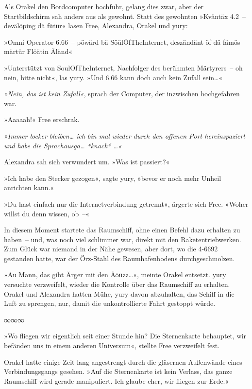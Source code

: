 Als Orakel den Bordcomputer hochfuhr, gelang dies zwar, aber der Startbildschirm sah anders aus als gewohnt. Statt des gewohnten »Kväntäx 4.2~– devälöping dä fütür« lasen Free, Alexandra, Orakel und yury:

»Omni Operator 6.66~– pöwärd bä SöülÖfTheInternet, deszändänt öf dä fämös märtür Flöätin Äländ«

»Unterstützt von SoulOfTheInternet, Nachfolger des berühmten Märtyrers~– oh nein, bitte nicht«, las yury. »Und 6.66 kann doch auch kein Zufall sein…«

\textit{»Nein, das ist kein Zufall«}, sprach der Computer, der inzwischen hochgefahren war.

»Aaaaah!« Free erschrak.

\textit{»Immer locker bleiben… ich bin mal wieder durch den offenen Port hereinspaziert und habe die Sprachausga… *knack* …«}

Alexandra sah sich verwundert um. »Was ist passiert?«

»Ich habe den Stecker gezogen«, sagte yury, »bevor er noch mehr Unheil anrichten kann.«

»Du hast einfach nur die Internetverbindung getrennt«, ärgerte sich Free. »Woher willst du denn wissen, ob~–«

In diesem Moment startete das Raumschiff, ohne einen Befehl dazu erhalten zu haben~– und, was noch viel schlimmer war, direkt mit den Raketentriebwerken. Zum Glück war niemand in der Nähe gewesen, aber dort, wo die 4-6692 gestanden hatte, war der Örz-Stahl des Raumhafenbodens durchgeschmolzen.

»Au Mann, das gibt Ärger mit den Äöüzz…«, meinte Orakel entsetzt. yury versuchte verzweifelt, wieder die Kontrolle über das Raumschiff zu erhalten. Orakel und Alexandra hatten Mühe, yury davon abzuhalten, das Schiff in die Luft zu sprengen, nur, damit die unkontrollierte Fahrt gestoppt würde.

\begin{center}
    ∞∞∞
\end{center}

»Wo fliegen wir eigentlich seit einer Stunde hin? Die Sternenkarte behauptet, wir befänden uns in einem anderen Universum«, stellte Free verzweifelt fest.

Orakel hatte einige Zeit lang angestrengt durch die gläsernen Außenwände eines Verbindungsgangs gesehen. »Auf die Sternenkarte ist kein Verlass, das ganze Raumschiff wird gerade manipuliert. Ich glaube eher, wir fliegen zur Erde.«

